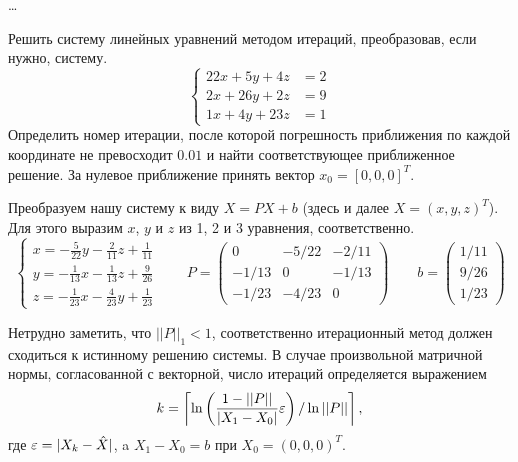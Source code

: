 \ldots


\begin{problem}
    Решить систему линейных уравнений методом итераций, преобразовав, если
    нужно, систему.
    \begin{equation*}
        \begin{cases}
            22x + 5y + 4z &= 2\\
            2x + 26y + 2z &= 9\\
            1x + 4y + 23z &= 1
        \end{cases}
    \end{equation*}
    Определить номер итерации, после которой погрешность приближения по каждой
    координате не превосходит $0.01$ и найти соответствующее приближенное
    решение. За нулевое приближение принять вектор $x_0 = [0, 0, 0]^T$.
\end{problem}

Преобразуем нашу систему к виду $X = PX + b$ (здесь и далее $X = (x, y, z)^T$).
Для этого выразим $x$, $y$ и $z$ из 1, 2 и 3 уравнения, соответственно.
\begin{equation*}
    \begin{cases}
        x = -\frac{5}{22}y - \frac{2}{11}z + \frac{1}{11}\\
        y = -\frac{1}{13}x - \frac{1}{13}z + \frac{9}{26}\\
        z = -\frac{1}{23}x - \frac{4}{23}y + \frac{1}{23}
    \end{cases}
    \qquad
    P = \begin{pmatrix}
        0 & -{5/22} & -{2/11}\\
        -{1/13} & 0 & -{1/13}\\
        -{1/23} & -{4/23} & 0
    \end{pmatrix}
    \qquad
    b = \begin{pmatrix}
        {1/11}\\
        {9/26}\\
        {1/23}
    \end{pmatrix}
\end{equation*}

Нетрудно заметить, что $||P||_1 < 1$, соответственно итерационный метод должен
сходиться к истинному решению системы. В случае произвольной матричной нормы,
согласованной с векторной, число итераций определяется выражением
\begin{equation*}
    k =  \left \lceil \ln \left(\frac{1 - ||P||}{|X_1 - X_0|} \varepsilon\right)
                      / \ln{||P||} \right \rceil,
\end{equation*}
где $\varepsilon = |X_k - \hat{X}|$, a $X_1 - X_0 = b$ при $X_0 = (0, 0, 0)^T$.

